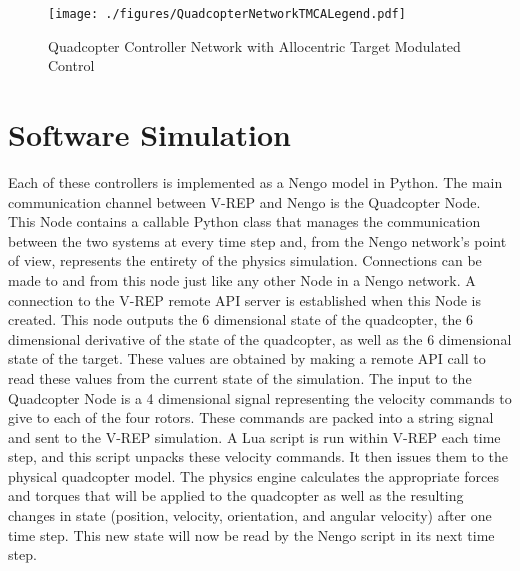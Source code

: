 \documentclass[letterpaper,12pt,titlepage,oneside,final]{book}
\begin{document}
\begin{figure}
\centering
\texttt{[image: ./figures/QuadcopterNetworkTMCALegend.pdf]} %
\caption{Quadcopter Controller Network with Allocentric Target Modulated Control}
\label{fig:NetTMCA}
\end{figure}

\section{Software Simulation}


Each of these controllers is implemented as a Nengo model in Python. 
The main communication channel between V-REP and Nengo is the Quadcopter Node. 
This Node contains a callable Python class that manages the communication between the two systems at every time step and, from the Nengo network's point of view, represents the entirety of the physics simulation. 
Connections can be made to and from this node just like any other Node in a Nengo network. 
A connection to the V-REP remote API server is established when this Node is created. 
This node outputs the 6 dimensional state of the quadcopter, the 6 dimensional derivative of the state of the quadcopter, as well as the 6 dimensional state of the target. 
These values are obtained by making a remote API call to read these values from the current state of the simulation. The input to the Quadcopter Node is a 4 dimensional signal representing the velocity commands to give to each of the four rotors. 
These commands are packed into a string signal and sent to the V-REP simulation. 
A Lua script is run within V-REP each time step, and this script unpacks these velocity commands. 
It then issues them to the physical quadcopter model. The physics engine calculates the appropriate forces and torques that will be applied to the quadcopter as well as the resulting changes in state (position, velocity, orientation, and angular velocity) after one time step. 
This new state will now be read by the Nengo script in its next time step.
\end{document}
